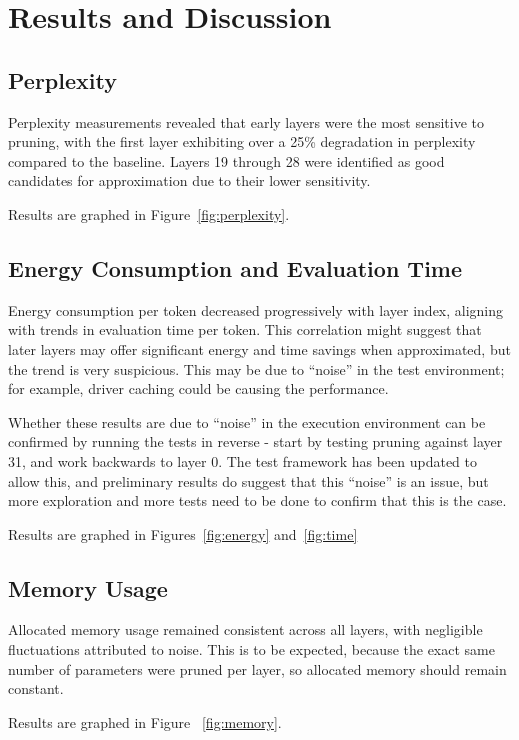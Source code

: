 \documentclass[conference]{IEEEtran}
\begin{document}
    \section{Results and Discussion}
    \subsection{Perplexity}
    Perplexity measurements revealed that early layers were the most sensitive to pruning, with the first layer exhibiting over a 25\% degradation in perplexity compared to the baseline.
    Layers 19 through 28 were identified as good candidates for approximation due to their lower sensitivity.

    Results are graphed in Figure~\ref{fig:perplexity}.

    \subsection{Energy Consumption and Evaluation Time}
    Energy consumption per token decreased progressively with layer index, aligning with trends in evaluation time per token.
    This correlation might suggest that later layers may offer significant energy and time savings when approximated, but the trend is very suspicious.
    This may be due to ``noise'' in the test environment; for example, driver caching could be causing the performance.

    Whether these results are due to ``noise'' in the execution environment can be confirmed by running the tests in reverse - start by testing pruning against layer 31, and work backwards to layer 0.
    The test framework has been updated to allow this, and preliminary results do suggest that this ``noise'' is an issue, but more exploration and more tests need to be done to confirm that this is the case.

    Results are graphed in Figures~\ref{fig:energy} and~\ref{fig:time}

    \subsection{Memory Usage}
    Allocated memory usage remained consistent across all layers, with negligible fluctuations attributed to noise.
    This is to be expected, because the exact same number of parameters were pruned per layer, so allocated memory should remain constant.

    Results are graphed in Figure ~\ref{fig:memory}.
\end{document}

